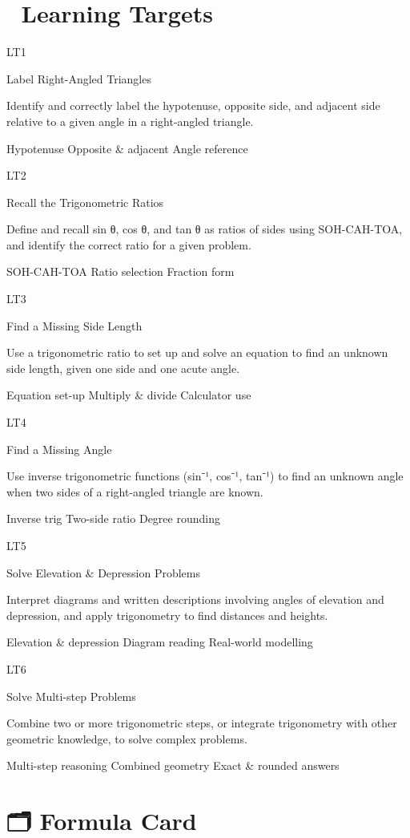 \documentclass[
  letterpaper,
  DIV=11,
  numbers=noendperiod]{scrreprt}
\theoremstyle{definition}
\theoremstyle{remark}
\begin{document}
\section{🎯 Learning Targets}\label{learning-targets-7}

LT1

Label Right-Angled Triangles

Identify and correctly label the hypotenuse, opposite side, and adjacent
side relative to a given angle in a right-angled triangle.

{Hypotenuse} {Opposite \& adjacent} {Angle reference}

LT2

Recall the Trigonometric Ratios

Define and recall sin θ, cos θ, and tan θ as ratios of sides using
SOH-CAH-TOA, and identify the correct ratio for a given problem.

{SOH-CAH-TOA} {Ratio selection} {Fraction form}

LT3

Find a Missing Side Length

Use a trigonometric ratio to set up and solve an equation to find an
unknown side length, given one side and one acute angle.

{Equation set-up} {Multiply \& divide} {Calculator use}

LT4

Find a Missing Angle

Use inverse trigonometric functions (sin⁻¹, cos⁻¹, tan⁻¹) to find an
unknown angle when two sides of a right-angled triangle are known.

{Inverse trig} {Two-side ratio} {Degree rounding}

LT5

Solve Elevation \& Depression Problems

Interpret diagrams and written descriptions involving angles of
elevation and depression, and apply trigonometry to find distances and
heights.

{Elevation \& depression} {Diagram reading} {Real-world modelling}

LT6

Solve Multi-step Problems

Combine two or more trigonometric steps, or integrate trigonometry with
other geometric knowledge, to solve complex problems.

{Multi-step reasoning} {Combined geometry} {Exact \& rounded answers}

\section{🗂️ Formula Card}\label{formula-card-4}
\end{document}
